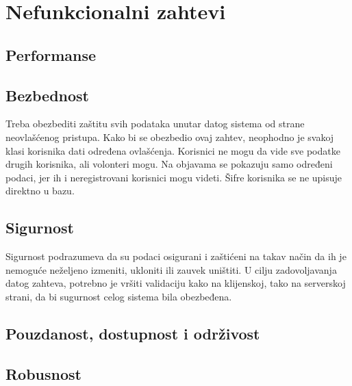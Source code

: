 \section{Nefunkcionalni zahtevi}
\subsection{Performanse}
\subsection{Bezbednost}
\par Treba obezbediti zaštitu svih podataka unutar datog sistema od strane neovlašćenog pristupa. Kako bi se obezbedio ovaj zahtev, neophodno je svakoj klasi korisnika dati određena ovlašćenja.
Korisnici ne mogu da vide sve podatke drugih korisnika, ali volonteri mogu. Na objavama se pokazuju samo određeni podaci, jer ih i neregistrovani korisnici mogu videti. Šifre korisnika se ne
upisuje direktno u bazu.
\subsection{Sigurnost}
\par Sigurnost podrazumeva da su podaci osigurani i zaštićeni na takav način da ih je nemoguće neželjeno izmeniti, ukloniti ili zauvek uništiti. U cilju zadovoljavanja datog zahteva, potrebno
je vršiti validaciju kako na klijenskoj, tako na serverskoj strani, da bi sugurnost celog sistema bila obezbeđena.
\subsection{Pouzdanost, dostupnost i održivost}
\subsection{Robusnost}